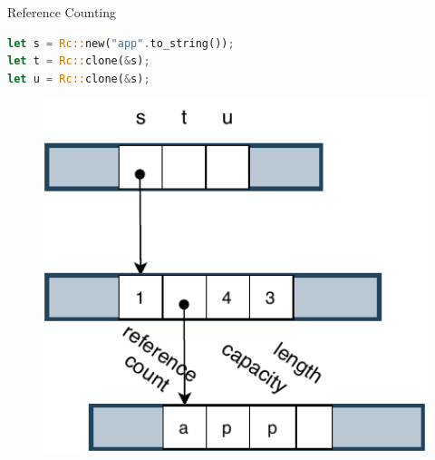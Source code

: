 \documentclass[9pt]{beamer}
\begin{document}

\begin{frame}[fragile]{Reference Counting}
    
\vspace{-0.5cm}
\begin{minipage}{0.7\linewidth}
\begin{lstlisting}[language=Rust]
let s = Rc::new("app".to_string());
let t = Rc::clone(&s);
let u = Rc::clone(&s); 
\end{lstlisting}
\end{minipage}      

    \begin{minipage}{0.3\linewidth}
        \begin{figure}[hp]
            \centering
            \begin{center}
                    \includegraphics[width=1.0\textwidth]{images/rc1.pdf}
                    \captionsetup{labelformat=empty}
            \end{center}
            

\end{figure}
\end{minipage}
\end{frame}
\end{document}
